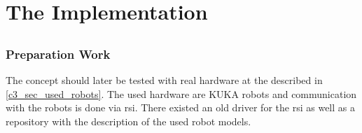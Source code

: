 \part{The Implementation}
\chapter{}
\label{sec:implementation}

\section{Preparation Work}
The concept should later be tested with real hardware at the described in \autoref{c3_sec_used_robots}. The used hardware are KUKA robots and communication with the robots is done via \gls{rsi}. There existed an old driver for the \gls{rsi} as well as a repository with the description of the used robot models.
